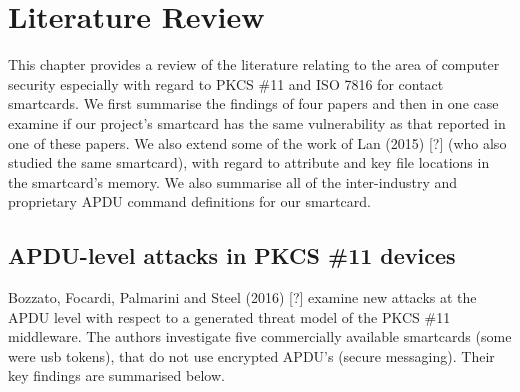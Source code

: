 \documentclass[bsc,frontabs,twoside,singlespacing,parskip,deptreport]{infthesis}     %
\begin{document}
\chapter{Literature Review}

This chapter provides a review of the literature relating to the area of computer security especially with regard to PKCS \#11 and ISO 7816 for contact smartcards. We first summarise the findings of four papers and then in one case examine if our project's smartcard has the same vulnerability as that reported in one of these papers. We also extend some of the work of Lan (2015) [?] (who also studied the same smartcard), with regard to attribute and key file locations in the smartcard's memory. We also summarise all of the inter-industry and proprietary APDU command definitions for our smartcard.

\section{APDU-level attacks in PKCS \#11 devices}

Bozzato, Focardi, Palmarini and Steel (2016) [?] examine new attacks at the APDU level with respect to a generated threat model of the PKCS \#11 middleware. The authors investigate five commercially available smartcards (some were usb tokens), that do not use encrypted APDU's (secure messaging). Their key findings are summarised below.
\end{document}
